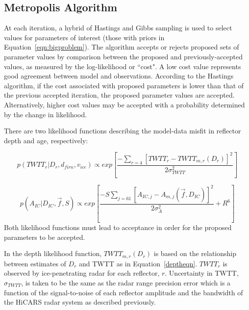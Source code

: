 \subsection{Metropolis Algorithm}\label{metrop}
At each iteration, a hybrid of Hastings and Gibbs sampling \citep{hastings1970,gelfand1992} is used to select values for parameters of interest (those with priors in Equation~\ref{eqn:bigproblem}). The algorithm accepts or rejects proposed sets of parameter values by comparison between the proposed and previously-accepted values, as measured by the log-likelihood or ``cost". A low cost value represents good agreement between model and observations. According to the Hastings algorithm, if the cost associated with proposed parameters is lower than that of the previous accepted iteration, the proposed parameter values are accepted. Alternatively, higher cost values may be accepted with a probability determined by the change in likelihood.


There are two likelihood functions describing the model-data misfit in reflector depth and age, respectively:

\begin{equation}\label{eqn:loglikedepth}
p(TWTT_r | D_r,d_{firn},v_{ice} ) \propto exp[\frac{-\sum_{r=4}[TWTT_{r} - TWTT_{m,r}(D_r)]^2}{2\sigma_{TWTT}^2}]
\end{equation}

\begin{equation}\label{eqn:loglikeage}
p(A_{IC} | D_{IC},\vec{f},S) \propto exp[\frac{-S\sum_{j = 61}[A_{IC,j} - A_{m,j}(\vec{f},D_{IC})]^2}{2\sigma_A^2} + R^6]
\end{equation}
Both likelihood functions must lead to acceptance in order for the proposed parameters to be accepted.

In the depth likelihood function, $TWTT_{m,r}(D_r)$ is based on the relationship between estimates of $D_r$ and TWTT as in Equation~\ref{deptheqn}. $TWTT_r$ is observed by ice-penetrating radar for each reflector, $r$. Uncertainty in TWTT, $\sigma_{TWTT}$, is taken to be the same as the radar range precision error which is a function of the signal-to-noise of each reflector amplitude and the bandwidth of the HiCARS radar system as described previously.



